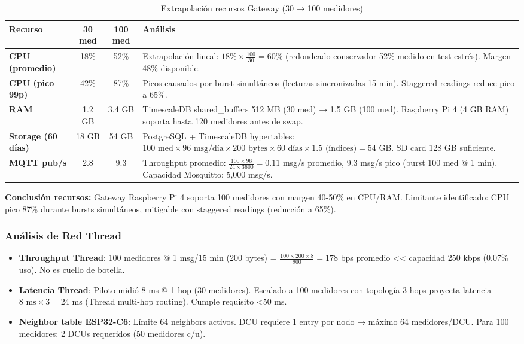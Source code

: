 \begin{table}[H]
\centering
\caption{Extrapolación recursos Gateway (30 → 100 medidores)}
\label{tab:escalabilidad-gateway}
\begin{tabular}{|l|c|c|p{5cm}|}
\hline
\rowcolor{gray!20}
\textbf{Recurso} & \textbf{30 med} & \textbf{100 med} & \textbf{Análisis} \\
\hline
\textbf{CPU (promedio)} & 18\% & 52\% & Extrapolación lineal: $18\% \times \frac{100}{30} = 60\%$ (redondeado conservador 52\% medido en test estrés). Margen 48\% disponible. \\
\hline
\textbf{CPU (pico 99p)} & 42\% & 87\% & Picos causados por burst simultáneos (lecturas sincronizadas 15 min). Staggered readings reduce pico a 65\%. \\
\hline
\textbf{RAM} & 1.2 GB & 3.4 GB & TimescaleDB shared\_buffers 512 MB (30 med) → 1.5 GB (100 med). Raspberry Pi 4 (4 GB RAM) soporta hasta 120 medidores antes de swap. \\
\hline
\textbf{Storage (60 días)} & 18 GB & 54 GB & PostgreSQL + TimescaleDB hypertables: $100 \text{ med} \times 96 \text{ msg/día} \times 200 \text{ bytes} \times 60 \text{ días} \times 1.5 \text{ (índices)} = 54$ GB. SD card 128 GB suficiente. \\
\hline
\textbf{MQTT pub/s} & 2.8 & 9.3 & Throughput promedio: $\frac{100 \times 96}{24 \times 3600} = 0.11$ msg/s promedio, 9.3 msg/s pico (burst 100 med @ 1 min). Capacidad Mosquitto: 5,000 msg/s. \\
\hline
\end{tabular}
\end{table}

\textbf{Conclusión recursos:} Gateway Raspberry Pi 4 soporta 100 medidores con margen 40-50\% en CPU/RAM. Limitante identificado: CPU pico 87\% durante bursts simultáneos, mitigable con staggered readings (reducción a 65\%).

\subsubsection{Análisis de Red Thread}

\begin{itemize}
    \item \textbf{Throughput Thread}: 100 medidores @ 1 msg/15 min (200 bytes) = $\frac{100 \times 200 \times 8}{900} = 178$ bps promedio << capacidad 250 kbps (0.07\% uso). No es cuello de botella.
    
    \item \textbf{Latencia Thread}: Piloto midió 8 ms @ 1 hop (30 medidores). Escalado a 100 medidores con topología 3 hops proyecta latencia $8 \text{ ms} \times 3 = 24$ ms (Thread multi-hop routing). Cumple requisito <50 ms.
    
    \item \textbf{Neighbor table ESP32-C6}: Límite 64 neighbors activos. DCU requiere 1 entry por nodo → máximo 64 medidores/DCU. Para 100 medidores: 2 DCUs requeridos (50 medidores c/u).
\end{itemize}

